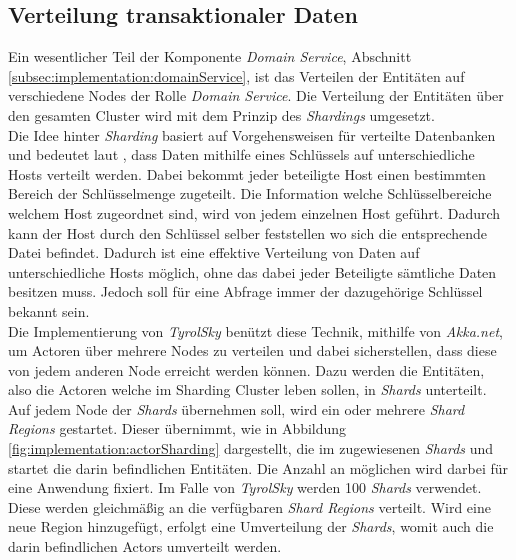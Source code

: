 \subsection{Verteilung transaktionaler Daten}
\label{subsec:implementation:akkaSharding}
Ein wesentlicher Teil der Komponente \textit{Domain Service}, Abschnitt \ref{subsec:implementation:domainService}, ist das Verteilen der Entitäten auf verschiedene Nodes der Rolle \textit{Domain Service}. Die Verteilung der Entitäten über den gesamten Cluster wird mit dem Prinzip des \textit{Shardings} umgesetzt. \\
Die Idee hinter \textit{Sharding} basiert auf Vorgehensweisen für verteilte Datenbanken und bedeutet laut \cite{shardingCattell}, dass Daten mithilfe eines Schlüssels auf unterschiedliche Hosts verteilt werden. Dabei bekommt jeder beteiligte Host einen bestimmten Bereich der Schlüsselmenge zugeteilt.
Die Information welche Schlüsselbereiche welchem Host zugeordnet sind, wird von jedem einzelnen Host geführt. Dadurch kann der Host durch den  Schlüssel selber feststellen wo sich die entsprechende Datei befindet.
Dadurch ist eine effektive Verteilung von Daten auf unterschiedliche Hosts möglich, ohne das dabei jeder Beteiligte sämtliche Daten besitzen muss. Jedoch soll für eine Abfrage immer der dazugehörige Schlüssel bekannt sein. \\
Die Implementierung von \textit{TyrolSky} benützt diese Technik, mithilfe von \textit{Akka.net}, um Actoren über mehrere Nodes zu verteilen und dabei sicherstellen, dass diese von jedem anderen Node erreicht werden können. Dazu werden die Entitäten, also die Actoren welche im Sharding Cluster leben sollen, in \textit{Shards} unterteilt. Auf jedem Node der \textit{Shards} übernehmen soll, wird ein oder mehrere  \textit{Shard Regions} gestartet. Dieser übernimmt, wie in Abbildung \ref{fig:implementation:actorSharding} dargestellt, die im zugewiesenen \textit{Shards} und startet die darin befindlichen Entitäten. Die Anzahl an möglichen  wird darbei für eine Anwendung fixiert. Im Falle von \textit{TyrolSky} werden {100} \textit{Shards} verwendet. Diese werden gleichmäßig an die verfügbaren \textit{Shard Regions} verteilt. Wird eine neue Region hinzugefügt, erfolgt eine Umverteilung der \textit{Shards}, womit auch die darin befindlichen Actors umverteilt werden. 

